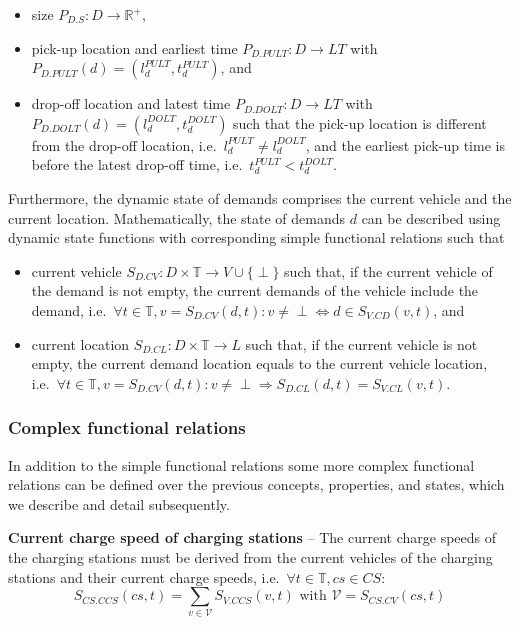 \documentclass[graybox]{svmult}
\begin{document}
\begin{itemize}
	\item size $P_{D.S}: D \rightarrow \mathbb{R}^+$,
	\item pick-up location and earliest time $P_{D.PULT}: D \rightarrow LT$ with $P_{D.PULT}(d) = (l_d^{PULT},t_d^{PULT})$, and
	\item drop-off location and latest time $P_{D.DOLT}: D \rightarrow LT$ with $P_{D.DOLT}(d) = (l_d^{DOLT},t_d^{DOLT})$ such that the pick-up location is different from the drop-off location, i.e.\ $l_d^{PULT} \neq l_d^{DOLT}$, and the earliest pick-up time is before the latest drop-off time, i.e.\ $t_d^{PULT} < t_d^{DOLT}$.
\end{itemize}
Furthermore, the dynamic state of demands comprises the current vehicle and the current location.
Mathematically, the state of demands $d$ can be described using dynamic state functions with corresponding simple functional relations such that
\begin{itemize}
	\item current vehicle $S_{D.CV}: D \times \mathbb{T} \rightarrow V \cup \{\perp\}$ such that, if the current vehicle of the demand is not empty, the current demands of the vehicle include the demand, i.e.\ $\forall t \in \mathbb{T}, v = S_{D.CV}(d,t): v \neq \perp \Leftrightarrow d \in S_{V.CD}(v,t)$, and
	\item current location $S_{D.CL}: D \times \mathbb{T} \rightarrow L$ such that, if the current vehicle is not empty, the current demand location equals to the current vehicle location, i.e.\ $\forall t \in \mathbb{T}, v = S_{D.CV}(d,t): v \neq \perp \Rightarrow S_{D.CL}(d,t)=S_{V.CL}(v,t)$.
\end{itemize}

\subsubsection{Complex functional relations}

\label{sec:complex}
In addition to the simple functional relations some more complex functional relations can be defined over the previous concepts, properties, and states, which we describe and detail subsequently.

\vspace{4mm}
\noindent
\textbf{Current charge speed of charging stations}
--
The current charge speeds of the charging stations must be derived from the current vehicles of the charging stations and their current charge speeds, i.e.\ $\forall t \in \mathbb{T}, cs \in CS:$
\[
S_{CS.CCS}(cs,t)=\sum_{v \in \mathcal{V}}S_{V.CCS}(v,t) \textrm{ with } \mathcal{V}=S_{CS.CV}(cs,t)
\]
\end{document}
